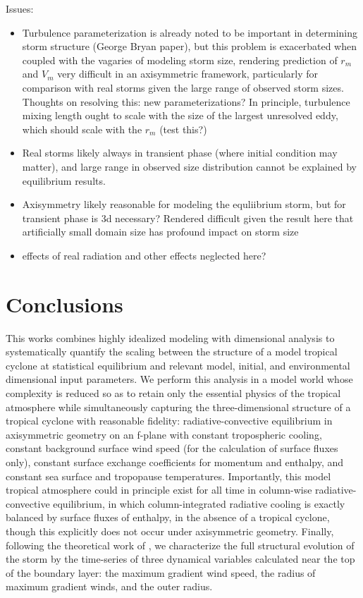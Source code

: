 \documentclass[12pt]{article}
\begin{document}
Issues:
\begin{itemize}
\item Turbulence parameterization is already noted to be important in determining storm structure (George Bryan paper), but this problem is exacerbated when coupled with the vagaries of modeling storm size, rendering prediction of $r_m$ and $V_m$ very difficult in an axisymmetric framework, particularly for comparison with real storms given the large range of observed storm sizes. Thoughts on resolving this: new parameterizations? In principle, turbulence mixing length ought to scale with the size of the largest unresolved eddy, which should scale with the $r_m$ (test this?) %
\item Real storms likely always in transient phase (where initial condition may matter), and large range in observed size distribution cannot be explained by equilibrium results.
\item Axisymmetry likely reasonable for modeling the equliibrium storm, but for transient phase is 3d necessary? Rendered difficult given the result here that artificially small domain size has profound impact on storm size
\item effects of real radiation and other effects neglected here?
\end{itemize}



\section{Conclusions}
This works combines highly idealized modeling with dimensional analysis to systematically quantify the scaling between the structure of a model tropical cyclone at statistical equilibrium and relevant model, initial, and environmental dimensional input parameters. We perform this analysis in a model world whose complexity is reduced so as to retain only the essential physics of the tropical atmosphere while simultaneously capturing the three-dimensional structure of a tropical cyclone with reasonable fidelity: radiative-convective equilibrium in axisymmetric geometry on an f-plane with constant tropospheric cooling, constant background surface wind speed (for the calculation of surface fluxes only), constant surface exchange coefficients for momentum and enthalpy, and constant sea surface and tropopause temperatures. Importantly, this model tropical atmosphere could in principle exist for all time in column-wise radiative-convective equilibrium, in which column-integrated radiative cooling is exactly balanced by surface fluxes of enthalpy, in the absence of a tropical cyclone, though this explicitly does not occur under axisymmetric geometry.  Finally, following the theoretical work of \cite{Emanuel_Rotunno_2011}, we characterize the full structural evolution of the storm by the time-series of three dynamical variables calculated near the top of the boundary layer: the maximum gradient wind speed, the radius of maximum gradient winds, and the outer radius.
\end{document}
